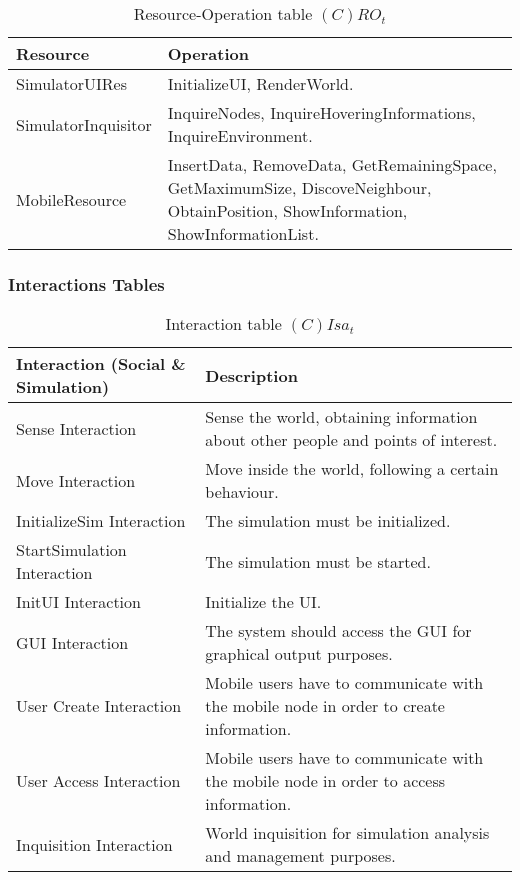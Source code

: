 \begin{table}[H]
	\centering
	\begin{tabular}{|p{4cm}|p{8cm}|}
			\hline
			\textbf{Resource} & \textbf{Operation} \\
			\hline
			SimulatorUIRes & InitializeUI, RenderWorld. \\
			\hline
			SimulatorInquisitor & InquireNodes, InquireHoveringInformations, InquireEnvironment. \\
			\hline
			MobileResource & InsertData, RemoveData, GetRemainingSpace,
			GetMaximumSize, DiscoveNeighbour, ObtainPosition, ShowInformation,
			ShowInformationList. \\
			\hline
		\end{tabular}
	\caption{Resource-Operation table $(C)RO_t$}
	\label{tab:crot}
\end{table}

\subsubsection{Interactions Tables}

\begin{table}[H]
	\centering
	\begin{tabular}{|p{4cm}|p{8cm}|}
			\hline
			\textbf{Interaction (Social \& Simulation)} & \textbf{Description} \\
			\hline
			Sense Interaction & Sense the world, obtaining information about other
			people and points of interest. \\
			\hline
			Move Interaction & Move inside the world, following a certain behaviour.
			\\
			\hline
			\hline
			InitializeSim Interaction & The simulation must be initialized. \\
			\hline
			StartSimulation Interaction & The simulation must be started. \\
			\hline
			InitUI Interaction & Initialize the UI. \\
			\hline
			GUI Interaction & The system should access the GUI for graphical output
			purposes. \\
			\hline
			User Create Interaction & Mobile users have to communicate with the
			mobile node in order to create information. \\
			\hline
			User Access Interaction & Mobile users have to communicate with the
			mobile node in order to access information. \\
			\hline
			\hline
			Inquisition Interaction & World inquisition for simulation analysis and
			management purposes. \\
			\hline
		\end{tabular}
	\caption{Interaction table $(C)Isa_t$}
	\label{tab:cisat}
\end{table}

